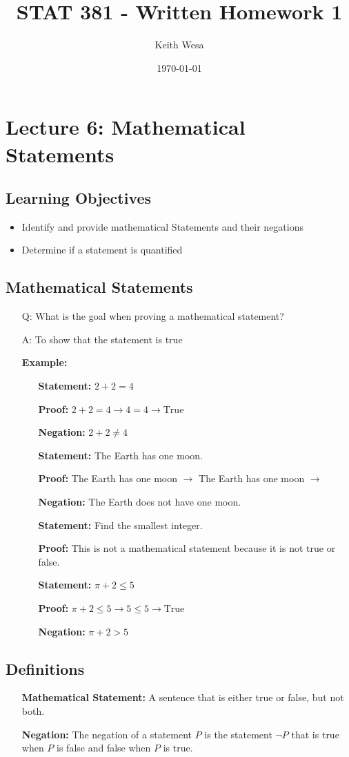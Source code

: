 \documentclass{article}
\author{Keith Wesa}
\title{STAT 381 - Written Homework 1}
\date{\today}
\begin{document}
\section*{Lecture 6: Mathematical Statements}
\subsection*{Learning Objectives}
\begin{itemize}
    \item Identify and provide mathematical Statements and their negations
    \item Determine if a statement is quantified
\end{itemize}
\subsection*{Mathematical Statements}
\begin{itemize}
    \item[Q:] What is the goal when proving a mathematical statement?
    \item[A:] To show that the statement is true
    \item[] \textbf{Example:} 
    \begin{itemize}
        \item[] \textbf{Statement:} $2 + 2 = 4$
        \item[] \textbf{Proof:} $2 + 2 = 4 \rightarrow 4 = 4 \rightarrow \text{True}$
        \item[] \textbf{Negation:} $2 + 2 \neq 4$
        \item[] \textbf{Statement:} The Earth has one moon.
        \item[] \textbf{Proof:} The Earth has one moon $\rightarrow$ The Earth has one moon $\rightarrow$ 
        \item[] \textbf{Negation:} The Earth does not have one moon.
        \item[] \textbf{Statement:} Find the smallest integer.
        \item[] \textbf{Proof:} This is not a mathematical statement because it is not true or false.
        \item[] \textbf{Statement:} $\pi + 2 \leq 5$
        \item[] \textbf{Proof:} $\pi + 2 \leq 5 \rightarrow 5 \leq 5 \rightarrow \text{True}$
        \item[] \textbf{Negation:} $\pi + 2 > 5$
        
    \end{itemize}
\end{itemize}
\subsection*{Definitions}
\begin{itemize}
    \item[] \textbf{Mathematical Statement:} A sentence that is either true or false, but not both.
    \item[] \textbf{Negation:} The negation of a statement $P$ is the statement $\lnot P$ that is true when $P$ is false and false when $P$ is true.

\end{itemize}
\end{document}
